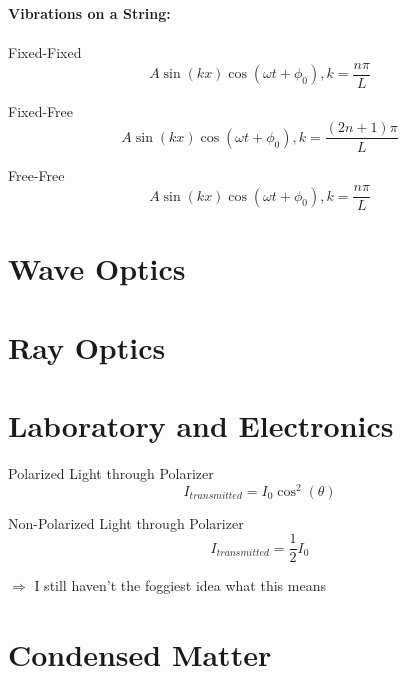 \documentclass{article}
\begin{document}
{\bf{Vibrations on a String:}}\\
\\
\hspace*{.5in}Fixed-Fixed\begin{equation}A\sin(kx)\cos(\omega t + \phi_0), k = \frac{n\pi}{L}\end{equation}

\hspace*{.5in}Fixed-Free\begin{equation}A\sin(kx)\cos(\omega t+\phi_0), k = \frac{(2n+1)\pi}{L}\end{equation}

\hspace*{.5in}Free-Free\begin{equation}A\sin(kx)\cos(\omega t + \phi_0), k= \frac{n\pi}{L}\end{equation}


\section{Wave Optics}










\section{Ray Optics}









\section{Laboratory and Electronics}
Polarized Light through Polarizer\begin{equation}I_{transmitted} = I_0\cos^2(\theta)\end{equation}

Non-Polarized Light through Polarizer\begin{equation}I_{transmitted}=\frac{1}{2}I_0\end{equation}

$\Rightarrow$ I still haven't the foggiest idea what this means








\section{Condensed Matter}
\end{document}
